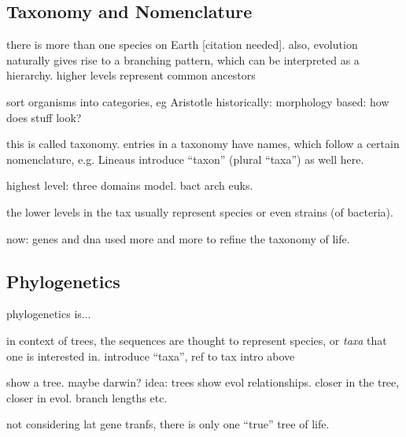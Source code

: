 \subsection{Taxonomy and Nomenclature}
\label{ch:Foundations:sec:TreeOfLife:sub:TaxonomyNomenclature}

there is more than one species on Earth [citation needed]. also, evolution naturally gives rise to a branching pattern,
which can be interpreted as a hierarchy. higher levels represent common ancestors

sort organisms into categories, eg Aristotle
historically: morphology based: how does stuff look?

this is called taxonomy.
entries in a taxonomy have names, which follow a certain nomenclature, e.g. Lineaus
introduce ``taxon'' (plural ``taxa'') as well here.

highest level: three domains model.
bact arch euks.

the lower levels in the tax usually represent species or even strains (\eg of bacteria).

now: genes and dna used more and more to refine the taxonomy of life.


\subsection{Phylogenetics}
\label{ch:Foundations:sec:TreeOfLife:sub:Phylogenetics}

phylogenetics is...

in context of trees, the sequences are thought to represent species, or \emph{taxa} that one is interested in.
introduce ``taxa'', ref to tax intro above

show a tree. maybe darwin?
idea: trees show evol relationships. closer in the tree, closer in evol.
branch lengths etc.

not considering lat gene tranfs,
there is only one ``true'' tree of life.


